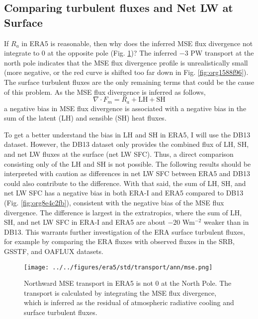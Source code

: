 \documentclass[11pt]{article}
\begin{document}
\subsection{Comparing turbulent fluxes and Net LW at Surface}
\label{sec:orga307dc7}
If \(R_a\) in ERA5 is reasonable, then why does the inferred MSE flux divergence not integrate to 0 at the opposite pole (Fig. \ref{fig:orge3fdd15})? The inferred \(-3\) PW transport at the north pole indicates that the MSE flux divergence profile is unrealistically small (more negative, or the red curve is shifted too far down in Fig. \ref{fig:org1588f96}). The surface turbulent fluxes are the only remaining terms that could be the cause of this problem. As the MSE flux divergence is inferred as follows,
\begin{equation}
\nabla \cdot F_m = R_a + \mathrm{LH} + \mathrm{SH}
\end{equation}
a negative bias in MSE flux divergence is associated with a negative bias in the sum of the latent (LH) and sensible (SH) heat fluxes.

To get a better understand the bias in LH and SH in ERA5, I will use the DB13 dataset. However, the DB13 dataset only provides the combined flux of LH, SH, and net LW fluxes at the surface (net LW SFC). Thus, a direct comparison consisting only of the LH and SH is not possible. The following results should be interpreted with caution as differences in net LW SFC between ERA5 and DB13 could also contribute to the difference. With that said, the sum of LH, SH, and net LW SFC has a negative bias in both ERA-I and ERA5 compared to DB13 (Fig. \ref{fig:org8e4c2fb}), consistent with the negative bias of the MSE flux divergence. The difference is largest in the extratropics, where the sum of LH, SH, and net LW SFC in ERA-I and ERA5 are about \(-20\) Wm\(^{-2}\) weaker than in DB13. This warrants further investigation of the ERA surface turbulent fluxes, for example by comparing the ERA fluxes with observed fluxes in the SRB, GSSTF, and OAFLUX datasets.

\begin{figure}[htbp]
\centering
\texttt{[image: ../../figures/era5/std/transport/ann/mse.png]}
\caption{\label{fig:orge3fdd15}Northward MSE transport in ERA5 is not 0 at the North Pole. The transport is calculated by integrating the MSE flux divergence, which is inferred as the residual of atmospheric radiative cooling and surface turbulent fluxes.}
\end{figure}
\end{document}
